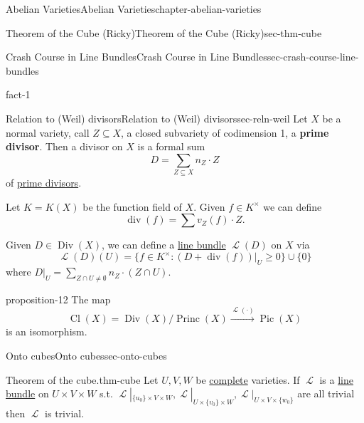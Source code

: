\documentclass[oneside,10pt,]{book}
\newcommand{\terminology}[1]{\textbf{#1}}
\numberwithin{equation}{section}
\newcommand{\sheaf}[1]{\operatorname{\mathcal{#1}}}
\DeclareMathOperator{\divisor}{div}
\DeclareMathOperator{\Cl}{Cl}
\DeclareMathOperator{\Div}{Div}
\DeclareMathOperator{\Pic}{Pic}
\DeclareMathOperator{\Princ}{Princ}
\begin{document}
\begin{chapterptx}{Abelian Varieties}{}{Abelian Varieties}{}{}{chapter-abelian-varieties}
\begin{sectionptx}{Theorem of the Cube (Ricky)}{}{Theorem of the Cube (Ricky)}{}{}{sec-thm-cube}
\begin{subsectionptx}{Crash Course in Line Bundles}{}{Crash Course in Line Bundles}{}{}{sec-crash-course-line-bundles}
\begin{fact}{}{}{fact-1}
\end{fact}
\end{subsectionptx}
%
%
\typeout{************************************************}
\typeout{************************************************}
%
\begin{subsectionptx}{Relation to (Weil) divisors}{}{Relation to (Weil) divisors}{}{}{sec-reln-weil}
\hypertarget{p-118}{}%
Let \(X\) be a normal variety, call \(Z\subseteq X\), a closed subvariety of codimension 1, a \terminology{prime divisor}. Then a divisor on \(X\) is a formal sum%
\begin{equation*}
D = \sum_{Z\subseteq X} n_Z\cdot Z
\end{equation*}
of \hyperref[sec-reln-weil]{prime divisors}.%
\par
\hypertarget{p-119}{}%
Let \(K = K(X)\) be the function field of \(X\). Given \(f\in K^\times\) we can define%
\begin{equation*}
\divisor (f) = \sum v_Z(f) \cdot Z\text{.}
\end{equation*}
%
\par
\hypertarget{p-120}{}%
Given \(D \in \Div(X)\), we can define a \hyperref[def-line-bundle]{line bundle} \(\sheaf L(D)\) on \(X\) via%
\begin{equation*}
\sheaf L(D)(U) = \{f\in K^\times : (D + \divisor (f))|_U\ge 0 \} \cup \{0\}
\end{equation*}
where \(D|_U = \sum_{Z\cap U\ne \emptyset} n_Z\cdot (Z\cap U)\).%
\begin{proposition}{}{}{proposition-12}%
\hypertarget{p-121}{}%
The map%
\begin{equation*}
\Cl(X) = \Div(X)/\Princ(X) \xrightarrow{\sheaf L(\cdot)} \Pic(X)
\end{equation*}
is an isomorphism.%
\end{proposition}
\end{subsectionptx}
%
%
\typeout{************************************************}
\typeout{************************************************}
%
\begin{subsectionptx}{Onto cubes}{}{Onto cubes}{}{}{sec-onto-cubes}
\begin{theorem}{Theorem of the cube.}{}{thm-cube}%
\hypertarget{p-122}{}%
Let \(U,V,W\) be \hyperref[def-abelian-complete-var]{complete} varieties. If \(\sheaf L \) is a \hyperref[def-line-bundle]{line bundle} on \(U\times V\times W\) s.t. \(\sheaf L|_{\{u_0\}\times V\times W},\sheaf L|_{U\times \{v_0\}\times W}, \sheaf L|_{U\times V\times \{w_0\}}\) are all trivial then \(\sheaf L\) is trivial.%

\end{theorem}
\end{subsectionptx}
\end{sectionptx}
\end{chapterptx}
\end{document}
